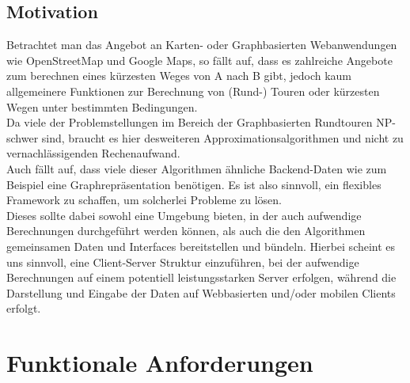 \documentclass[a4paper,10pt,titlepage,parskip=true]{article}
\begin{document}
\subsection{Motivation}
Betrachtet man das Angebot an Karten- oder Graphbasierten Webanwendungen wie OpenStreetMap und Google Maps, so fällt auf, dass
es zahlreiche Angebote zum berechnen eines kürzesten Weges von A nach B gibt, jedoch kaum allgemeinere Funktionen zur
Berechnung von (Rund-) Touren oder kürzesten Wegen unter bestimmten Bedingungen.\\
Da viele der Problemstellungen im Bereich der Graphbasierten Rundtouren NP-schwer sind, braucht es hier desweiteren Approximationsalgorithmen und
nicht zu vernachlässigenden Rechenaufwand.\\
Auch fällt auf, dass viele dieser Algorithmen ähnliche Backend-Daten wie zum Beispiel eine Graphrepräsentation benötigen. Es ist also sinnvoll, ein flexibles Framework zu schaffen, um solcherlei Probleme zu lösen.\\
Dieses sollte dabei sowohl eine Umgebung bieten, in der auch aufwendige Berechnungen durchgeführt werden können, als auch die den Algorithmen gemeinsamen Daten und Interfaces
bereitstellen und bündeln. Hierbei scheint es uns sinnvoll, eine Client-Server Struktur einzuführen, bei der aufwendige Berechnungen auf einem potentiell leistungsstarken Server erfolgen, während die Darstellung und Eingabe der Daten auf Webbasierten und/oder mobilen Clients erfolgt.

\section{Funktionale Anforderungen}
\end{document}

